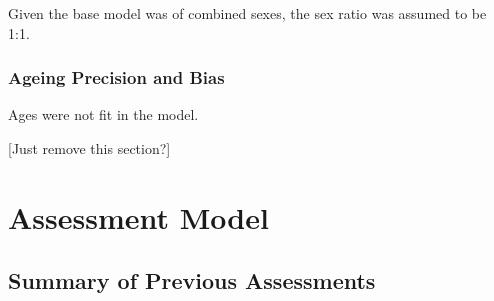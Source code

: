 \documentclass[11pt,
  english,
  a4paper,
]{article}
\begin{document}

Given the base model was of combined sexes, the sex ratio was assumed to be 1:1.

\leavevmode\tagmcend\tagstructend\par


\hypertarget{ageing-precision-and-bias}{%
\subsubsection{Ageing Precision and Bias}\label{ageing-precision-and-bias}}

\leavevmode\tagmcend\tagstructend


Ages were not fit in the model.

\leavevmode\tagmcend\tagstructend\par


{[}Just remove this section?{]}

\leavevmode\tagmcend\tagstructend\par


\hypertarget{assessment-model}{%
\section{Assessment Model}\label{assessment-model}}

\leavevmode\tagmcend\tagstructend


\hypertarget{summary-of-previous-assessments}{%
\subsection{Summary of Previous Assessments}\label{summary-of-previous-assessments}}

\leavevmode\tagmcend\tagstructend

\end{document}
